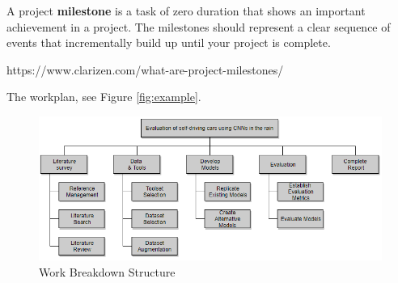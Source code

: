 A project \textbf{milestone} is a task of zero duration that shows an important achievement in a project. The milestones should represent a clear sequence of events that incrementally build up until your project is complete.

https://www.clarizen.com/what-are-project-milestones/

The workplan, see Figure \ref{fig:example}. 

\begin{figure}[ht]
\centering\includegraphics[width=1\linewidth]{figures/work-breakdown-structure.png}
\caption{Work Breakdown Structure}
\label{fig:workplan}
\end{figure}

% 